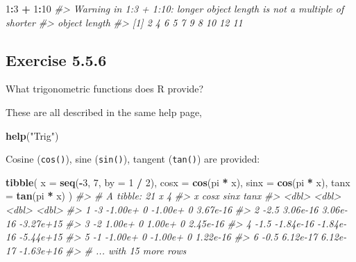 \documentclass[]{book}
\newenvironment{Shaded}{\begin{snugshade}}{\end{snugshade}}
\newcommand{\CommentTok}[1]{\textcolor[rgb]{0.56,0.35,0.01}{\textit{#1}}}
\newcommand{\DataTypeTok}[1]{\textcolor[rgb]{0.13,0.29,0.53}{#1}}
\newcommand{\DecValTok}[1]{\textcolor[rgb]{0.00,0.00,0.81}{#1}}
\newcommand{\KeywordTok}[1]{\textcolor[rgb]{0.13,0.29,0.53}{\textbf{#1}}}
\newcommand{\NormalTok}[1]{#1}
\newcommand{\OperatorTok}[1]{\textcolor[rgb]{0.81,0.36,0.00}{\textbf{#1}}}
\newcommand{\StringTok}[1]{\textcolor[rgb]{0.31,0.60,0.02}{#1}}
\theoremstyle{plain}
\theoremstyle{remark}
\begin{document}
\begin{Shaded}
\begin{Highlighting}[]
\DecValTok{1}\OperatorTok{:}\DecValTok{3} \OperatorTok{+}\StringTok{ }\DecValTok{1}\OperatorTok{:}\DecValTok{10}
\CommentTok{#> Warning in 1:3 + 1:10: longer object length is not a multiple of shorter}
\CommentTok{#> object length}
\CommentTok{#>  [1]  2  4  6  5  7  9  8 10 12 11}
\end{Highlighting}
\end{Shaded}

\hypertarget{exercise-5.5.6}{%
\subsection*{\texorpdfstring{Exercise
{5.5.6}}{Exercise 5.5.6}}\label{exercise-5.5.6}}

What trigonometric functions does R provide?

These are all described in the same help page,

\begin{Shaded}
\begin{Highlighting}[]
\KeywordTok{help}\NormalTok{(}\StringTok{"Trig"}\NormalTok{)}
\end{Highlighting}
\end{Shaded}

Cosine (\texttt{cos()}), sine (\texttt{sin()}), tangent (\texttt{tan()})
are provided:

\begin{Shaded}
\begin{Highlighting}[]
\KeywordTok{tibble}\NormalTok{(}
  \DataTypeTok{x =} \KeywordTok{seq}\NormalTok{(}\OperatorTok{-}\DecValTok{3}\NormalTok{, }\DecValTok{7}\NormalTok{, }\DataTypeTok{by =} \DecValTok{1} \OperatorTok{/}\StringTok{ }\DecValTok{2}\NormalTok{),}
  \DataTypeTok{cosx =} \KeywordTok{cos}\NormalTok{(pi }\OperatorTok{*}\StringTok{ }\NormalTok{x),}
  \DataTypeTok{sinx =} \KeywordTok{cos}\NormalTok{(pi }\OperatorTok{*}\StringTok{ }\NormalTok{x),}
  \DataTypeTok{tanx =} \KeywordTok{tan}\NormalTok{(pi }\OperatorTok{*}\StringTok{ }\NormalTok{x)}
\NormalTok{)}
\CommentTok{#> # A tibble: 21 x 4}
\CommentTok{#>       x      cosx      sinx      tanx}
\CommentTok{#>   <dbl>     <dbl>     <dbl>     <dbl>}
\CommentTok{#> 1  -3   -1.00e+ 0 -1.00e+ 0  3.67e-16}
\CommentTok{#> 2  -2.5  3.06e-16  3.06e-16 -3.27e+15}
\CommentTok{#> 3  -2    1.00e+ 0  1.00e+ 0  2.45e-16}
\CommentTok{#> 4  -1.5 -1.84e-16 -1.84e-16 -5.44e+15}
\CommentTok{#> 5  -1   -1.00e+ 0 -1.00e+ 0  1.22e-16}
\CommentTok{#> 6  -0.5  6.12e-17  6.12e-17 -1.63e+16}
\CommentTok{#> # ... with 15 more rows}
\end{Highlighting}
\end{Shaded}
\end{document}
